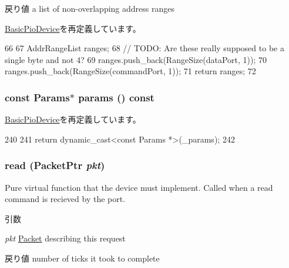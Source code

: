 \begin{DoxyReturn}{戻り値}
a list of non-\/overlapping address ranges 
\end{DoxyReturn}


\hyperlink{classBasicPioDevice_a36cf113d5e5e091ebddb32306c098fae}{BasicPioDevice}を再定義しています。


\begin{DoxyCode}
66 {
67     AddrRangeList ranges;
68     // TODO: Are these really supposed to be a single byte and not 4?
69     ranges.push_back(RangeSize(dataPort, 1));
70     ranges.push_back(RangeSize(commandPort, 1));
71     return ranges;
72 }
\end{DoxyCode}
\hypertarget{classX86ISA_1_1I8042_acd3c3feb78ae7a8f88fe0f110a718dff}{
\subsubsection[{params}]{\setlength{\rightskip}{0pt plus 5cm}const {\bf Params}$\ast$ params () const}}
\label{classX86ISA_1_1I8042_acd3c3feb78ae7a8f88fe0f110a718dff}


\hyperlink{classBasicPioDevice_acd3c3feb78ae7a8f88fe0f110a718dff}{BasicPioDevice}を再定義しています。


\begin{DoxyCode}
240     {
241         return dynamic_cast<const Params *>(_params);
242     }
\end{DoxyCode}
\hypertarget{classX86ISA_1_1I8042_a613ec7d5e1ec64f8d21fec78ae8e568e}{
\subsubsection[{read}]{ read ({\bf PacketPtr} {\em pkt})}}
\label{classX86ISA_1_1I8042_a613ec7d5e1ec64f8d21fec78ae8e568e}
Pure virtual function that the device must implement. Called when a read command is recieved by the port. 
\begin{DoxyParams}{引数}
\item[{\em pkt}]\hyperlink{classPacket}{Packet} describing this request \end{DoxyParams}
\begin{DoxyReturn}{戻り値}
number of ticks it took to complete 
\end{DoxyReturn}


